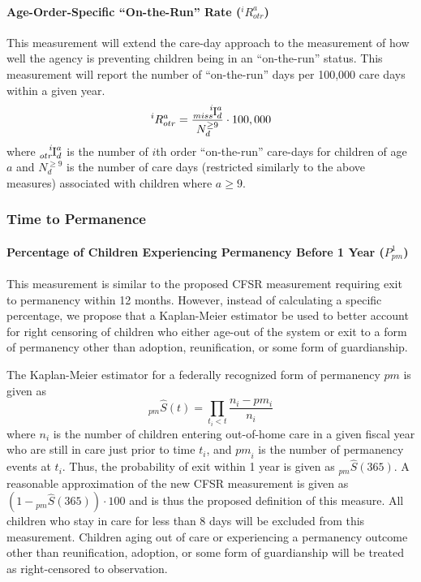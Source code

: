 \documentclass[12pt]{article}\usepackage[]{graphicx}\usepackage[]{color}
\begin{document}
\paragraph{Age-Order-Specific ``On-the-Run'' Rate (${}^iR_{otr}^a$)}
This measurement will extend the care-day approach to the measurement of how well the agency is preventing children being in an ``on-the-run'' status. This measurement will report the number of ``on-the-run'' days per 100,000 care days within a given year.  
\begin{equation}\label{eq:Rmj}
{}^iR_{otr}^a = \frac{\ce{^{$i$}_{$miss$}I^{$a$}_{$d$}}}{N_d^{\geq9}} \cdot 100,000
\end{equation}
where $\ce{^{$i$}_{$otr$}I^{$a$}_{$d$}}$ is the number of $i$th order ``on-the-run'' care-days for children of age $a$ and $N_d^{\geq9}$ is the number of care days (restricted similarly to the above measures) associated with children where $a\geq9$. 

\subsubsection{Time to Permanence}

\paragraph{Percentage of Children Experiencing Permanency Before 1 Year ($P_{pm}^1$)}

This measurement is similar to the proposed CFSR measurement requiring exit to permanency within 12 months. However, instead of calculating a specific percentage, we propose that a Kaplan-Meier estimator be used to better account for right censoring of children who either age-out of the system or exit to a form of permanency other than adoption, reunification, or some form of guardianship. 
 
The Kaplan-Meier estimator for a federally recognized form of permanency $pm$ is given as
\begin{equation}\label{eq:KM1}
{}_{pm}\hat S(t) = \prod\limits_{t_i<t} \frac{n_i-pm_{i}}{n_i}
\end{equation}
where $n_{i}$ is the number of children entering out-of-home care in a given fiscal year who are still in care just prior to time $t_{i}$, and ${pm}_{i}$ is the number of permanency events at $t_{i}$. Thus, the probability of exit within 1 year is given as ${}_{pm}\hat S(365)$. A reasonable approximation of the new CFSR measurement is given as $(1 - {}_{pm}\hat S(365)) \cdot 100$ and is thus the proposed definition of this measure. All children who stay in care for less than 8 days will be excluded from this measurement. Children aging out of care or experiencing a permanency outcome other than reunification, adoption, or some form of guardianship will be treated as right-censored to observation. 
\end{document}
